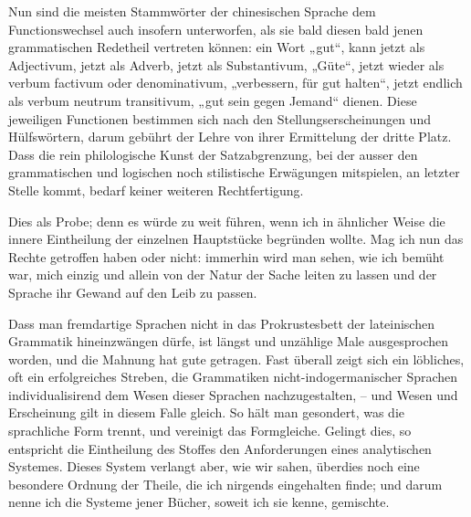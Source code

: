 Nun sind die meisten Stammwörter der chinesischen Sprache dem Functionswechsel auch insofern unterworfen, als sie bald diesen bald jenen grammatischen Redetheil vertreten können: ein Wort „gut“, kann jetzt als Adjectivum, jetzt als Adverb, jetzt als Substantivum, „Güte“, jetzt wieder als verbum factivum oder denominativum, „verbessern, für gut halten“, jetzt endlich als verbum neutrum transitivum, „gut sein gegen Jemand“ dienen. Diese jeweiligen Functionen bestimmen sich nach den Stellungserscheinungen und Hülfswörtern, darum gebührt der Lehre von ihrer Ermittelung der dritte Platz. Dass die rein philologische Kunst der Satzabgrenzung, bei der ausser den grammatischen und logischen noch stilistische Erwägungen mitspielen, an letzter Stelle kommt, bedarf keiner weiteren Rechtfertigung.

Dies als Probe; denn es würde zu weit führen, wenn ich in ähnlicher Weise die innere Eintheilung der einzelnen Hauptstücke begründen wollte. Mag ich nun das Rechte getroffen haben oder nicht: immerhin wird man sehen, wie ich bemüht war, mich einzig und allein von der Natur der Sache leiten zu lassen und der Sprache ihr Gewand auf den Leib zu passen.

Dass man fremdartige Sprachen nicht in das Prokrustesbett der lateinischen Grammatik hineinzwängen dürfe, ist längst und unzählige Male ausgesprochen worden, und die Mahnung hat gute  getragen. Fast überall zeigt sich ein löbliches, oft ein erfolgreiches Streben, \label{fp.94} die Grammatiken nicht-indo\-german\-ischer Sprachen individualisirend dem Wesen dieser Sprachen nachzugestalten, – und Wesen und Erscheinung gilt in diesem Falle gleich. So hält man gesondert, was die sprachliche Form trennt, und vereinigt das Formgleiche. Gelingt dies, so entspricht die Eintheilung des Stoffes den Anforderungen eines analytischen Systemes. Dieses System verlangt aber, wie wir sahen, überdies noch eine besondere Ordnung der Theile, die ich nirgends eingehalten finde; und darum nenne ich die Systeme jener Bücher, soweit ich sie kenne, gemischte.

